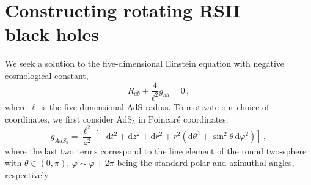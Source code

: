 \documentclass[%
 reprint,
 amsmath,amssymb,
 aps,
]{revtex4-2}
\begin{document}
\section{Constructing rotating RSII \\ black holes}\label{Construct}
We seek a solution to the five-dimensional Einstein equation with negative cosmological constant,
\begin{equation}
R_{ab}+\frac{4}{\ell^2}g_{ab}=0\,,
\label{eq:einstein}
\end{equation}
where $\ell$ is the five-dimensional AdS radius. To motivate our choice of coordinates, we first consider AdS$_5$ in Poincar\'e coordinates:
\begin{equation}
\label{AdS5}
    g_{AdS_5} = \frac{\ell^2}{z^2}\left[-\mathrm{d}t^2+\mathrm{d}z^2+\mathrm{d}r^2+r^2 \left(\mathrm{d}\theta^2+\sin^2\theta\,\mathrm{d}\varphi^2\right)\right]\,,
\end{equation}%
where the last two terms correspond to the line element of the round two-sphere with $\theta\in(0,\pi)$, $\varphi\sim \varphi+2\pi$ being the standard polar and azimuthal angles, respectively.
\end{document}
